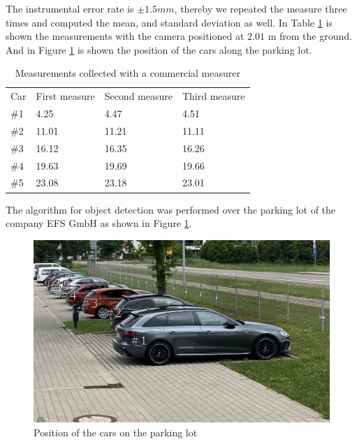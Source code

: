 The instrumental error rate is $\pm 1.5 mm$, thereby we repeated the measure three times and computed the mean, and standard deviation as well. In Table \ref{tab:tab_measure} is shown the measurements with the camera positioned at $2.01$ m from the ground. And in Figure \ref{fig:park} is shown the position of the cars along the parking lot. 



\begin{table}[H]
\centering
\caption{Measurements collected with a commercial measurer}
\begin{tabular}{l|l|l|l} 
\toprule
Car & First measure & Second measure & Third measure  \\
\#1   & 4.25          & 4.47           & 4.51           \\
\#2   & 11.01         & 11.21          & 11.11          \\
\#3   & 16.12         & 16.35          & 16.26          \\
\#4   & 19.63         & 19.69          & 19.66          \\
\#5   & 23.08         & 23.18          & 23.01          \\
\bottomrule
\end{tabular}
\label{tab:tab_measure}
\end{table} 


The algorithm for object detection was performed over the parking lot of the company EFS GmbH as shown in Figure \ref{fig:park}.


\begin{figure}[H]
\centering
\includegraphics[scale=0.5]{imagens/park.JPG}
\caption{Position of the cars on the parking lot}
\label{fig:park}
\end{figure}

